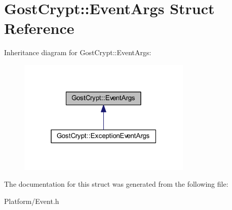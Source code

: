 \hypertarget{struct_gost_crypt_1_1_event_args}{}\section{Gost\+Crypt\+:\+:Event\+Args Struct Reference}
\label{struct_gost_crypt_1_1_event_args}


Inheritance diagram for Gost\+Crypt\+:\+:Event\+Args\+:
\nopagebreak
\begin{figure}[H]
\begin{center}
\leavevmode
\includegraphics[width=235pt]{struct_gost_crypt_1_1_event_args__inherit__graph}
\end{center}
\end{figure}


The documentation for this struct was generated from the following file\+:\begin{DoxyCompactItemize}
\item 
Platform/Event.\+h\end{DoxyCompactItemize}
